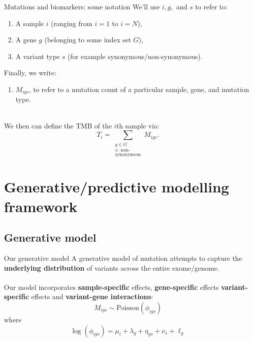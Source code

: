 \documentclass{beamer}
\begin{document}
\begin{frame}{Mutations and biomarkers: some notation}
We'll use $i,g,$ and $s$ to refer to:
\begin{enumerate}
    \item A sample $i$ (ranging from $i=1$ to $i=N$),
    \item A gene $g$ (belonging to some index set $G$),
    \item A variant type $s$ (for example synonymous/non-synonymous).
\end{enumerate}
Finally, we write:
\begin{enumerate}[4]  
    \item $M_{igs}$, to refer to a mutation count of a particular sample, gene, and mutation type.
\end{enumerate} 
~\\
We then can define the TMB of the $i$th sample via:
\[
T_i = \sum_{\substack{g \in G \\ s: \ \text{non-}\\ \text{synonymous}}} M_{igs}.
\]

\end{frame}

\section{Generative/predictive modelling framework}
\subsection{Generative model}

\begin{frame}{Our generative model}
A generative model of mutation attempts to capture the \textbf{underlying distribution} of variants across the entire exome/genome. \\
~\\
Our model incorporates \textbf{sample-specific} effects, \textbf{gene-specific} effects \textbf{variant-specific} effects and \textbf{variant-gene interactions}:
\begin{equation}
    M_{igs} \sim \text{Poisson}(\phi_{igs})
\end{equation}
where 
\begin{equation}
\log(\phi_{igs}) = \mu_i + \lambda_g + \eta_{gs} + \nu_s + \ell_g
\end{equation} 
\end{frame}
\end{document}
